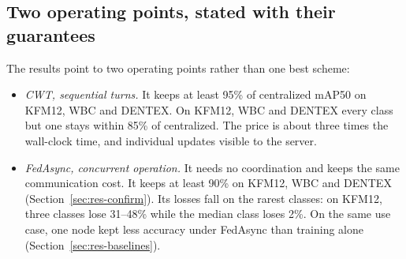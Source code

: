 \documentclass[pdflatex,sn-mathphys-num]{sn-jnl}
\begin{document}
\subsection{Two operating points, stated with their guarantees}
The results point to two operating points rather than one best scheme:
\begin{itemize}
\item \emph{CWT, sequential turns.} It keeps at least 95\% of centralized mAP50 on KFM12, WBC and DENTEX. On KFM12, WBC and DENTEX every class but one stays within 85\% of centralized. The price is about three times the wall-clock time, and individual updates visible to the server.
\item \emph{FedAsync, concurrent operation.} It needs no coordination and keeps the same communication cost. It keeps at least 90\% on KFM12, WBC and DENTEX (Section~\ref{sec:res-confirm}). Its losses fall on the rarest classes: on KFM12, three classes lose 31--48\% while the median class loses 2\%. On the same use case, one node kept less accuracy under FedAsync than training alone (Section~\ref{sec:res-baselines}).
\end{itemize}
\end{document}
